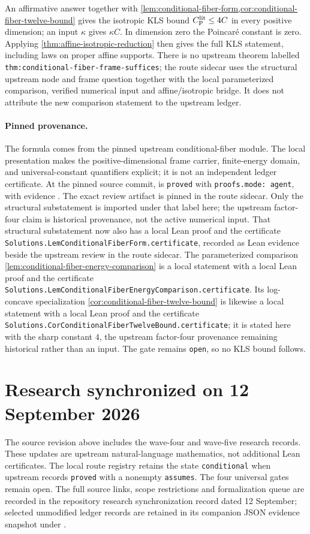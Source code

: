 An affirmative answer together with \cref{lem:conditional-fiber-form,cor:conditional-fiber-twelve-bound}
gives the isotropic KLS bound $C_{\mathrm P}^{\mathrm{lit}}\le4C$ in every positive dimension; an input $\kappa$
gives $\kappa C$. In dimension zero the Poincar\'e constant is
zero.  Applying \cref{thm:affine-isotropic-reduction} then gives the full KLS statement, including
laws on proper affine supports.  There is no
upstream theorem labelled \texttt{thm:conditional-fiber-frame-suffices}; the route sidecar uses
the structural upstream node and frame question together with the local parameterized comparison,
verified numerical input and affine/isotropic bridge. It does not attribute the new comparison
statement to the upstream ledger.

\paragraph{Pinned provenance.}
The formula comes from the pinned upstream conditional-fiber module.  The local presentation
makes the positive-dimensional frame carrier, finite-energy domain, and universal-constant
quantifiers explicit; it is not an independent ledger certificate.  At the pinned source commit,
 is
\texttt{proved} with \texttt{proofs.mode: agent}, with evidence
.  The exact review artifact is pinned in
the route sidecar. Only the structural substatement is imported under that label here; the
upstream factor-four claim is historical provenance, not the active numerical input.  That
structural substatement now also has a local Lean proof and the certificate
\texttt{Solutions.LemConditionalFiberForm.certificate}, recorded as Lean evidence beside the
upstream review in the route sidecar.
The parameterized comparison \cref{lem:conditional-fiber-energy-comparison} is a local statement
with a local Lean proof and the certificate
\texttt{Solutions.LemConditionalFiberEnergyComparison.certificate}.  Its log-concave
specialization \cref{cor:conditional-fiber-twelve-bound} is likewise a local statement with a
local Lean proof and the certificate
\texttt{Solutions.CorConditionalFiberTwelveBound.certificate}; it is stated here with the sharp
constant $4$, the upstream factor-four provenance remaining historical rather than an input. The
gate  remains \texttt{open}, so no KLS bound follows.


\section*{Research synchronized on 12 September 2026}
The source revision above includes the wave-four and wave-five research records. These
updates are upstream natural-language mathematics, not additional Lean certificates.
The local route registry retains the state \texttt{conditional} when upstream records
\texttt{proved} with a nonempty \texttt{assumes}. The four universal gates remain open.
The full source links, scope restrictions and formalization queue are recorded in
the repository research synchronization record dated 12 September; selected unmodified ledger
records are retained in its companion JSON evidence snapshot under .

